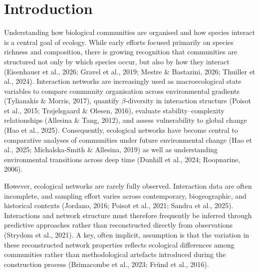 \documentclass[
]{article}
\begin{document}
\newpage


\linenumbers
\doublespacing %

\makeatletter
{}%
\makeatother

\section{Introduction}\label{introduction}

Understanding how biological communities are organised and how species
interact is a central goal of ecology. While early efforts focused
primarily on species richness and composition, there is growing
recognition that communities are structured not only by which species
occur, but also by how they interact (Eisenhauer et al., 2026; Gravel et
al., 2019; Mestre \& Bastazini, 2026; Thuiller et al., 2024).
Interaction networks are increasingly used as macroecological state
variables to compare community organisation across environmental
gradients (Tylianakis \& Morris, 2017), quantify \(\beta\)-diversity in
interaction structure (Poisot et al., 2015; Trøjelsgaard \& Olesen,
2016), evaluate stability--complexity relationships (Allesina \& Tang,
2012), and assess vulnerability to global change (Hao et al., 2025).
Consequently, ecological networks have become central to comparative
analyses of communities under future environmental change (Hao et al.,
2025; Michalska-Smith \& Allesina, 2019) as well as understanding
environmental transitions across deep time (Dunhill et al., 2024;
Roopnarine, 2006).

However, ecological networks are rarely fully observed. Interaction data
are often incomplete, and sampling effort varies across contemporary,
biogeographic, and historical contexts (Jordano, 2016; Poisot et al.,
2021; Sandra et al., 2025). Interactions and network structure must
therefore frequently be inferred through predictive approaches rather
than reconstructed directly from observations (Strydom et al., 2021). A
key, often implicit, assumption is that the variation in these
reconstructed network properties reflects ecological differences among
communities rather than methodological artefacts introduced during the
construction process (Brimacombe et al., 2023; Fründ et al., 2016).
\end{document}
